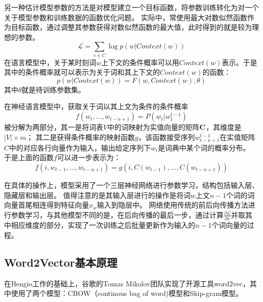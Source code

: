 另一种估计模型参数的方法是对模型建立一个目标函数，将参数训练转化为对一个关于模型参数和训练数据的函数优化问题。
实际中，常使用最大对数似然函数作为目标函数，通过调整其参数获得对数似然函数的最大值，此时得到的就是较为理想的参数。
\begin{equation}
    \mathcal{L} = \sum_{c\in C} \log p(w|Context(w))
\end{equation}
在语言模型中，关于某时刻词$w$上下文的条件概率可以用$Context(w)$表示。于是其中的条件概率就可以表示为关于词和其上下文的$Context(w)$的函数：
\begin{equation}
    p(w|Context(w)) = F(w, Context(w), \theta)
\end{equation}
其中$\theta$就是待训练参数集。

在神经语言模型中，获取关于词以其上文为条件的条件概率
\begin{equation}
    f(w_t, \dots, w_{t-n+1}) = P(w_t|w_1^{t-1})
\end{equation}
被分解为两部分，其一是将词表$V$中的词映射为实值向量的矩阵$\boldsymbol{\mathbf{C}}$，其维度是$|V|\times m$；
其二是获得条件概率的映射函数$g$，该函数接受序列$w_{t-n+1}^{t-1}$在实值矩阵$C$中的对应各行向量作为输入，输出给定序列下$w_t$是词典中某个词的概率分布。
于是上面的函数$f$可以进一步表示为：
\begin{equation}
    f(i, w_{t-1}, \dots, w_{t-n+1}) = g(i, C(w_{t-1}), \dots, C(w_{t-n+1}))
\end{equation}

在具体的操作上，模型采用了一个三层神经网络进行参数学习，结构包括输入层、隐藏层和输出层。
值得注意的是其输入层进行的操作是将词$w$上文$n-1$个词的词向量首尾相连得到特征向量$x_w$输入到隐层中。
网络使用传统的前后向传播方法进行参数学习，与其他模型不同的是，在后向传播的最后一步，通过计算$\frac{\partial\mathcal{L}}{\partial x}$并取其中相应维度的部分，实现了一次训练之后批量更新作为输入的$n-1$个词向量的过程。

\subsection{Word2Vector基本原理}
在Bengio工作的基础上，谷歌的Tomas Mikolov团队实现了开源工具word2vec，其中使用了两个模型：CBOW（continous bag of word)模型和Skip-gram模型。

